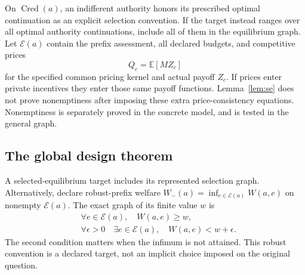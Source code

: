 \documentclass[11pt,a4paper]{article}
\numberwithin{equation}{section}
\theoremstyle{definition}
\newcommand{\E}{\mathbb E}
\newcommand{\Cred}{\operatorname{Cred}}
\begin{document}
On \(\Cred(a)\), an indifferent authority honors its prescribed optimal
continuation as an explicit selection convention. If the target instead
ranges over all optimal authority continuations, include all of them in
the equilibrium graph. Let \(\mathcal E(a)\) contain the prefix assessment,
all declared budgets, and competitive prices
\[
 Q_c=\E[MZ_c]
\]
for the specified common pricing kernel and actual payoff \(Z_c\).
If prices enter private incentives they enter those same payoff functions.
Lemma~\ref{lem:se} does not prove nonemptiness after imposing these extra
price-consistency equations. Nonemptiness is separately proved in the
concrete model, and is tested in the general graph.

\subsection{The global design theorem}
A selected-equilibrium target includes its represented selection graph.
Alternatively, declare robust-prefix welfare
\(W_-(a)=\inf_{e\in\mathcal E(a)}W(a,e)\) on nonempty \(\mathcal E(a)\).
The exact graph of its finite value \(w\) is
\begin{equation}\label{eq:lowergraph}
\begin{split}
&\forall e\in\mathcal E(a),\quad W(a,e)\ge w,\\
&\forall \epsilon>0\quad
 \exists e\in\mathcal E(a),\quad W(a,e)<w+\epsilon.
\end{split}
\end{equation}
The second condition matters when the infimum is not attained. This
robust convention is a declared target, not an implicit choice imposed
on the original question.
\end{document}
